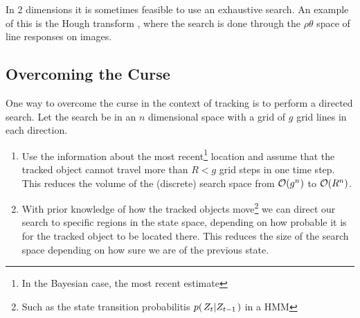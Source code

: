 \begin{example}
  In 2 dimensions it is sometimes feasible to use an exhaustive search.
  An example of this is the Hough transform \cite{DigitalImageProcessing}, 
  where the search is done through the $\rho\theta$ space of line responses on images.
\end{example}

\subsection{Overcoming the Curse}
One way to overcome the curse in the context of tracking is to perform a directed search. Let the search be in an $n$ dimensional space with a grid of $g$ grid lines in each direction.

\begin{enumerate}
    \item Use the information about the most recent\footnote{In the Bayesian case, the most recent estimate} 
    location and assume that the tracked object cannot travel more than $R < g$ grid steps in one time step. 
    This reduces the volume of the (discrete) search space from $\mathcal{O}{\left(g^n\right)}$ to $\mathcal{O}{\left(R^n\right)}$.
    \item With prior knowledge of how the tracked objects move\footnote{Such as the state transition 
    probabilitis $p{(\left. Z_t \middle\vert Z_{t-1} \right.)}$ in a HMM} we can direct our search to specific regions in the state space, 
    depending on how probable it is for the tracked object to be located there. This reduces the size of the
    search space depending on how sure we are of the previous state.
\end{enumerate} 


